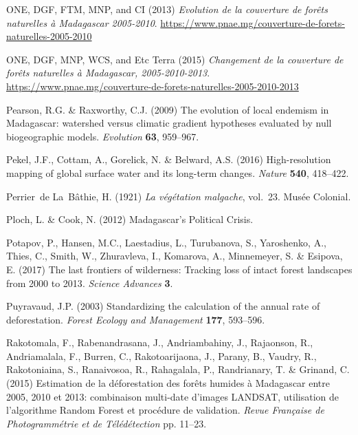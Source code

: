 \documentclass[a4paper, 12pt, leqno]{article} %
\begin{document}
\begin{thebibliography}{60}
{ONE, DGF, FTM, MNP, and CI} (2013) \emph{{Evolution de la couverture de
  forêts naturelles à Madagascar 2005-2010}}. \url{https://www.pnae.mg/couverture-de-forets-naturelles-2005-2010}

{ONE, DGF, MNP, WCS, and Etc Terra} (2015) \emph{{Changement de la couverture
  de forêts naturelles à Madagascar, 2005-2010-2013}}. \url{https://www.pnae.mg/couverture-de-forets-naturelles-2005-2010-2013}

Pearson, R.G. \& Raxworthy, C.J. (2009) {The evolution of local endemism in
  Madagascar: watershed versus climatic gradient hypotheses evaluated by null
  biogeographic models}. \emph{Evolution} \textbf{63}, 959--967.

Pekel, J.F., Cottam, A., Gorelick, N. \& Belward, A.S. (2016) {High-resolution
  mapping of global surface water and its long-term changes}. \emph{Nature}
  \textbf{540}, 418--422.

Perrier~de La~B{\^a}thie, H. (1921) \emph{{La v{\'e}g{\'e}tation malgache}},
  vol.~23. Mus{\'e}e Colonial.

Ploch, L. \& Cook, N. (2012) {Madagascar's Political Crisis}.

Potapov, P., Hansen, M.C., Laestadius, L., Turubanova, S., Yaroshenko, A.,
  Thies, C., Smith, W., Zhuravleva, I., Komarova, A., Minnemeyer, S. \&
  Esipova, E. (2017) {The last frontiers of wilderness: Tracking loss of intact
  forest landscapes from 2000 to 2013}. \emph{Science Advances} \textbf{3}.

Puyravaud, J.P. (2003) Standardizing the calculation of the annual rate of
  deforestation. \emph{Forest Ecology and Management} \textbf{177}, 593--596.

Rakotomala, F., Rabenandrasana, J., Andriambahiny, J., Rajaonson, R.,
  Andriamalala, F., Burren, C., Rakotoarijaona, J., Parany, B., Vaudry, R.,
  Rakotoniaina, S., Ranaivosoa, R., Rahagalala, P., Randrianary, T. \& Grinand,
  C. (2015) {Estimation de la d{\'e}forestation des for{\^e}ts humides {\`a}
  Madagascar entre 2005, 2010 et 2013: combinaison multi-date d'images LANDSAT,
  utilisation de l'algorithme Random Forest et proc{\'e}dure de validation}.
  \emph{Revue Fran{\c{c}}aise de Photogramm{\'e}trie et de
  T{\'e}l{\'e}d{\'e}tection} pp. 11--23.


\end{thebibliography}
\end{document}
